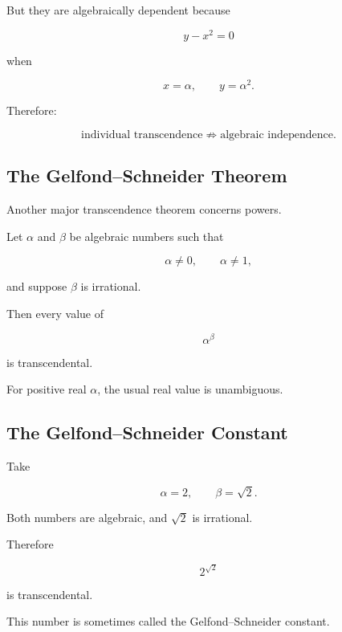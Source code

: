 But they are algebraically dependent because

\[ y-x^2=0 \]

when

\[ x=\alpha,\qquad y=\alpha^2. \]

Therefore:

\[
\boxed{
\text{individual transcendence}
\not\Longrightarrow
\text{algebraic independence}.
}
\]

\subsection{The Gelfond--Schneider Theorem}
\label{subsec:gelfond-schneider}

Another major transcendence theorem concerns powers.

\begin{theorem}
Let \(\alpha\) and \(\beta\) be algebraic numbers such that

\[ \alpha\neq0,\qquad\alpha\neq1, \]

and suppose \(\beta\) is irrational.

Then every value of

\[ \boxed{\alpha^\beta} \]

is transcendental.
\end{theorem}

For positive real \(\alpha\), the usual real value is unambiguous.

\subsection{The Gelfond--Schneider Constant}
\label{subsec:gelfond-schneider-constant}

Take

\[ \alpha=2,\qquad\beta=\sqrt2. \]

Both numbers are algebraic, and \(\sqrt2\) is irrational.

Therefore

\[ \boxed{2^{\sqrt2}} \]

is transcendental.

This number is sometimes called the Gelfond--Schneider constant.

